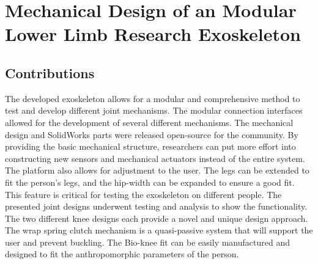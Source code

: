 
\chapter{Mechanical Design of an Modular Lower Limb Research Exoskeleton}
\label{chap:mech}











\section{Contributions}

The developed exoskeleton allows for a modular and comprehensive method to test and develop different joint mechanisms. The modular connection interfaces allowed for the development of several different mechanisms. The mechanical design and SolidWorks parts were released open-source for the community. By providing the basic mechanical structure, researchers can put more effort into constructing new sensors and mechanical actuators instead of the entire system. The platform also allows for adjustment to the user. The legs can be extended to fit the person's legs, and the hip-width can be expanded to ensure a good fit. This feature is critical for testing the exoskeleton on different people. The presented joint designs underwent testing and analysis to show the functionality. The two different knee designs each provide a novel and unique design approach. The wrap spring clutch mechanism is a quasi-passive system that will support the user and prevent buckling. The Bio-knee fit can be easily manufactured and designed to fit the anthropomorphic parameters of the person.



